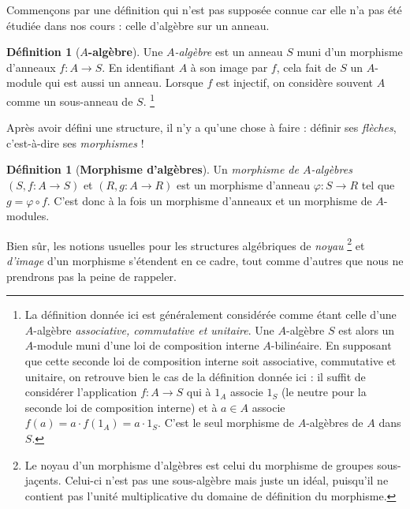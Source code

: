 \documentclass[10pt, twoside]{article}
\theoremstyle{plain}
\theoremstyle{definition}
\newtheorem{definition}[theorem]{Définition}
\theoremstyle{plain}
\theoremstyle{plain}
\theoremstyle{definition}
\theoremstyle{remark}
\begin{document}
Commençons par une définition qui n'est pas supposée connue car elle n'a pas été étudiée dans nos cours : celle d'algèbre sur un anneau.

\begin{definition}[\textbf{$A$-algèbre}]\label{def:alg}
    Une \textit{$A$-algèbre} est un anneau $S$ muni d'un morphisme d'anneaux $f : A \longrightarrow S$. En identifiant $A$ à son image par $f$, cela fait de $S$ un $A$-module qui est aussi un anneau. Lorsque $f$ est injectif, on considère souvent $A$ comme un sous-anneau de $S$. \footnote{La définition donnée ici est généralement considérée comme étant celle d'une $A$-algèbre \textit{associative, commutative et unitaire}. Une $A$-algèbre $S$ est alors un $A$-module muni d'une loi de composition interne $A$-bilinéaire. En supposant que cette seconde loi de composition interne soit associative, commutative et unitaire, on retrouve bien le cas de la définition donnée ici : il suffit de considérer l'application $f : A \longrightarrow S$ qui à $1_A$ associe $1_S$ (le neutre pour la seconde loi de composition interne) et à $a \in A$ associe $f(a) = a \cdot f(1_A) = a \cdot 1_S$. C'est le seul morphisme de $A$-algèbres de $A$ dans $S$.}
\end{definition}

Après avoir défini une structure, il n'y a qu'une chose à faire : définir ses \textit{flèches}, c'est-à-dire ses \textit{morphismes} !

\begin{definition}[\textbf{Morphisme d'algèbres}]\label{def:morph alg}
    Un \textit{morphisme de $A$-algèbres} $(S, f : A \rightarrow S)$ et $(R, g : A \rightarrow R)$ est un morphisme d'anneau $\varphi : S \longrightarrow R$ tel que $g = \varphi \circ f$. C'est donc à la fois un morphisme d'anneaux et un morphisme de $A$-modules.

    \begin{center}
    \end{center}
\end{definition}

Bien sûr, les notions usuelles pour les structures algébriques de \textit{noyau} \footnote{Le noyau d'un morphisme d'algèbres est celui du morphisme
de groupes sous-jaçents. Celui-ci n'est pas une sous-algèbre mais juste un idéal, puisqu'il ne contient pas l'unité multiplicative du domaine de définition du morphisme.}  et \textit{d'image} d'un morphisme s'étendent en ce cadre, tout comme d'autres que nous ne prendrons pas la peine de rappeler. 
\end{document}
